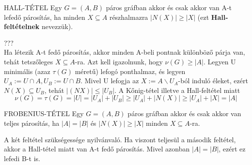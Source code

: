 \begin{tetel}{HALL-TÉTEL}
Egy $G = (A,B)$ páros gráfban akkor és csak akkor van A-t lefedő párosítás, ha minden $X \subseteq A$ részhalmazra $|N(X)| \geq |X|$ (ezt \textbf{Hall-feltételnek} nevezzük).
\end{tetel}

\begin{bizonyitas}{}
??? \\
Ha létezik A-t fedő párosítás, akkor minden A-beli pontnak különböző párja van, tehát tetszőleges $X \subseteq A$-ra. Azt kell igazolnunk, hogy $\nu(G) \geq |A|$. Legyen U minimális (azaz $\tau(G)$ méretű) lefogó ponthalmaz, és legyen $U_A :=U\cap A,U_B:=U\cap B$. Mivel U lefogja az $X := A \backslash U_A$-ból induló éleket, ezért $N(X) \subseteq U_B$, tehát $|(NX)| \leq |U_B|$. A Kőnig-tétel illetve a Hall-feltétel miatt
$$\nu(G) = \tau(G) = |U| = |U_A| + |U_B| \geq |U_A| + |N(X)| \geq |U_A| + |X| = |A|$$
\end{bizonyitas}

\begin{tetel}{FROBENIUS-TÉTEL}
Egy $G = (A,B)$ páros gráfban akkor és csak akkor van teljes párosítás, ha $|A| = |B|$ és $|N(X)| \geq |X|$ minden $X \subseteq A$-ra.
\end{tetel}

\begin{bizonyitas}{}
A két feltétel szükségessége nyilvánvaló. Ha viszont teljesül a második feltétel, akkor a Hall-tétel miatt van A-t fedő párosítás. Mivel azonban $|A| = |B|$, ezért ez lefedi B-t is.
\end{bizonyitas}
